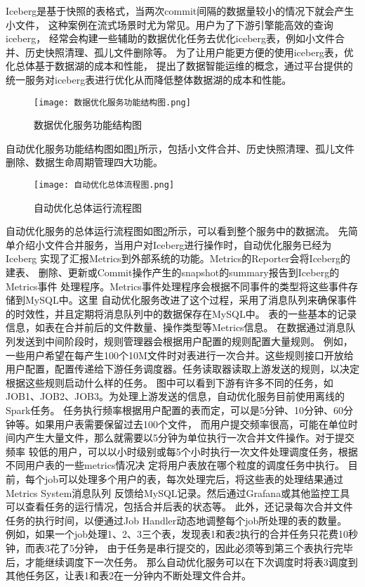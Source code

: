 Iceberg是基于快照的表格式，当两次commit间隔的数据量较小的情况下就会产生小文件，
这种案例在流式场景时尤为常见。用户为了下游引擎能高效的查询iceberg，
经常会构建一些辅助的数据优化任务去优化iceberg表，例如小文件合并、历史快照清理、孤儿文件删除等。
为了让用户能更方便的使用iceberg表，优化总体基于数据湖的成本和性能，
提出了数据智能运维的概念，通过平台提供的统一服务对iceberg表进行优化从而降低整体数据湖的成本和性能。

\begin{figure}[H]
  \centering
  \texttt{[image: 数据优化服务功能结构图.png]}
  \caption{数据优化服务功能结构图}
  \label{fig:数据优化服务功能结构图}
\end{figure}

自动优化服务功能结构图如图\ref{fig:数据优化服务功能结构图}所示，包括小文件合并、历史快照清理、孤儿文件删除、数据生命周期管理四大功能。

\begin{figure}[H]
  \centering
  \texttt{[image: 自动优化总体流程图.png]}
  \caption{自动优化总体运行流程图}
  \label{fig:自动优化总体运行流程图}
\end{figure}

自动优化服务的总体运行流程图如图\ref{fig:自动优化总体运行流程图}所示，可以看到整个服务中的数据流。
先简单介绍小文件合并服务，当用户对Iceberg进行操作时，自动优化服务已经为Iceberg
实现了汇报Metrics到外部系统的功能。Metrics的Reporter会将Iceberg的建表、
删除、更新或Commit操作产生的snapshot的summary报告到Iceberg的Metrics事件
处理程序。Metrics事件处理程序会根据不同事件的类型将这些事件存储到MySQL中。这里
自动优化服务改进了这个过程，采用了消息队列来确保事件的时效性，并且定期将消息队列中的数据保存在MySQL中。
表的一些基本的记录信息，如表在合并前后的文件数量、操作类型等Metrics信息。
在数据通过消息队列发送到中间阶段时，规则管理器会根据用户配置的规则配置大量规则。
例如，一些用户希望在每产生100个10M文件时对表进行一次合并。这些规则接口开放给
用户配置，配置传递给下游任务调度器。任务读取器读取上游发送的规则，以决定根据这些规则启动什么样的任务。
图中可以看到下游有许多不同的任务，如JOB1、JOB2、JOB3。为处理上游发送的信息，自动优化服务目前使用离线的Spark任务。
任务执行频率根据用户配置的表而定，可以是5分钟、10分钟、60分钟等。如果用户表需要保留过去100个文件，
而用户提交频率很高，可能在单位时间内产生大量文件，那么就需要以5分钟为单位执行一次合并文件操作。对于提交频率
较低的用户，可以以小时级别或每5个小时执行一次文件处理调度任务，根据不同用户表的一些metrics情况决
定将用户表放在哪个粒度的调度任务中执行。
目前，每个job可以处理多个用户的表，每次处理完后，将这些表的处理结果通过Metrics System消息队列
反馈给MySQL记录。然后通过Grafana或其他监控工具可以查看任务的运行情况，包括合并后表的状态等。
此外，还记录每次合并文件任务的执行时间，以便通过Job Handler动态地调整每个job所处理的表的数量。
例如，如果一个job处理1、2、3三个表，发现表1和表2执行的合并任务只花费10秒钟，而表3花了5分钟，
由于任务是串行提交的，因此必须等到第三个表执行完毕后，才能继续调度下一次任务。
那么自动优化服务可以在下次调度时将表3调度到其他任务区，让表1和表2在一分钟内不断处理文件合并。

